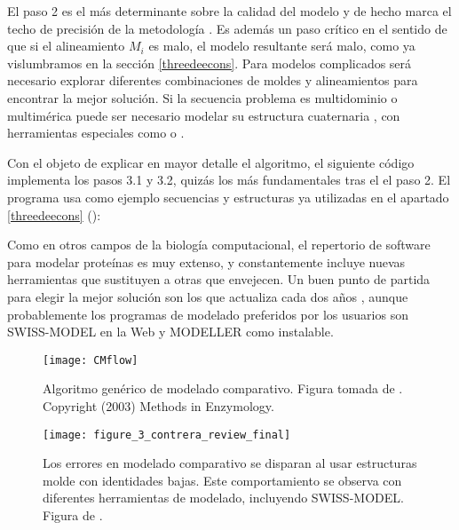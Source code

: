 El paso 2 es el m\'{a}s determinante sobre la calidad del modelo y de hecho marca el techo de precisi\'{o}n de la metodolog\'{i}a 
\citep{ContrerasMoreira2005}. Es adem\'{a}s un paso cr\'{i}tico en el sentido de que si el alineamiento $M_{i}$ es malo, 
el modelo resultante ser\'{a} malo, como ya vislumbramos en la secci\'{o}n \ref{threedeecons}. Para modelos complicados ser\'{a} 
necesario explorar diferentes combinaciones de moldes y alineamientos para encontrar la mejor soluci\'{o}n. %
Si la secuencia problema es multidominio o multim\'{e}rica puede ser necesario modelar su estructura cuaternaria \citep{Tramontano2017}, 
con herramientas especiales como
 o 
.

Con el objeto de explicar en mayor detalle el algoritmo, el siguiente c\'{o}digo implementa los pasos 3.1 y 3.2, quiz\'{a}s
los m\'{a}s fundamentales tras el el paso 2. El programa usa como ejemplo secuencias
y estructuras ya utilizadas en el apartado \ref{threedeecons} ():


Como en otros campos de la biolog\'{i}a computacional, el repertorio de software para modelar prote\'{i}nas es muy extenso,
y constantemente incluye nuevas herramientas que sustituyen a otras que envejecen.
Un buen punto de partida para elegir la mejor soluci\'{o}n son los  que actualiza cada dos a\~nos 
, aunque probablemente los 
programas de modelado preferidos por los usuarios son SWISS-MODEL en la Web y MODELLER como instalable.

\begin{figure}
\begin{center} 
\texttt{[image: CMflow]}
\caption%
{
Algoritmo gen\'{e}rico de modelado comparativo.
Figura tomada de \citet{Fiser2003}. Copyright (2003) Methods in Enzymology.
}
\label{fig:CMflow}
\end{center}
\end{figure}

\begin{figure}
\begin{center} 
\texttt{[image: figure\_3\_contrera\_review\_final]}
\caption%
{
Los errores en modelado comparativo se disparan al usar estructuras molde con identidades bajas.
Este comportamiento se observa con diferentes herramientas de modelado, incluyendo SWISS-MODEL.
Figura de \citet{Contreras-Moreira2002b}. 
}
\label{fig:CMbench}
\end{center}
\end{figure}

